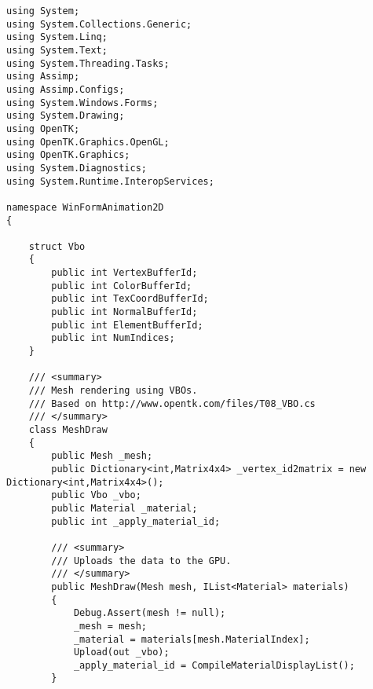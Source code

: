 \begin{scriptsize}
\begin{verbatim}
using System;
using System.Collections.Generic;
using System.Linq;
using System.Text;
using System.Threading.Tasks;
using Assimp;
using Assimp.Configs;
using System.Windows.Forms;
using System.Drawing;
using OpenTK;
using OpenTK.Graphics.OpenGL;
using OpenTK.Graphics;
using System.Diagnostics;
using System.Runtime.InteropServices;

namespace WinFormAnimation2D
{

    struct Vbo
    {
        public int VertexBufferId;
        public int ColorBufferId;
        public int TexCoordBufferId;
        public int NormalBufferId;
        public int ElementBufferId;
        public int NumIndices;
    }

    /// <summary>
    /// Mesh rendering using VBOs.
    /// Based on http://www.opentk.com/files/T08_VBO.cs
    /// </summary>
    class MeshDraw
    {
        public Mesh _mesh;
        public Dictionary<int,Matrix4x4> _vertex_id2matrix = new Dictionary<int,Matrix4x4>();
        public Vbo _vbo;
        public Material _material;
        public int _apply_material_id;

        /// <summary>
        /// Uploads the data to the GPU.
        /// </summary>
        public MeshDraw(Mesh mesh, IList<Material> materials)
        {
            Debug.Assert(mesh != null);
            _mesh = mesh;
            _material = materials[mesh.MaterialIndex];
            Upload(out _vbo);
            _apply_material_id = CompileMaterialDisplayList();
        }


\end{verbatim}
\end{scriptsize}
